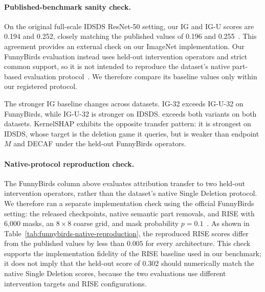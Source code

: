 \paragraph{Published-benchmark sanity check.}
On the original full-scale IDSDS ResNet-50 setting, our IG and IG-U scores are 0.194 and 0.252, closely matching the published values of 0.196 and 0.255~\citep{hesse2024benchmarking}. This agreement provides an external check on our ImageNet implementation. Our FunnyBirds evaluation instead uses held-out intervention operators and strict common support, so it is not intended to reproduce the dataset's native part-based evaluation protocol~\citep{hesse2023funnybirds}. We therefore compare its baseline values only within our registered protocol.


The stronger IG baseline changes across datasets. IG-32 exceeds IG-U-32 on FunnyBirds, while IG-U-32 is stronger on IDSDS.  exceeds both variants on both datasets. KernelSHAP exhibits the opposite transfer pattern: it is strongest on IDSDS, whose target is the deletion game it queries, but is weaker than endpoint $M$ and DECAF under the held-out FunnyBirds operators.

\paragraph{Native-protocol reproduction check.}
The FunnyBirds column above evaluates attribution transfer to two held-out
intervention operators, rather than the dataset's native Single Deletion
protocol. We therefore ran a separate implementation check using the official
FunnyBirds setting: the released checkpoints, native semantic part removals,
and RISE with 6,000 masks, an $8\times8$ coarse grid, and mask probability
$p=0.1$~\citep{hesse2023funnybirds}. As shown in
Table~\ref{tab:funnybirds-native-reproduction}, the reproduced RISE scores
differ from the published values by less than $0.005$ for every architecture.
This check supports the implementation fidelity of the RISE baseline used in
our benchmark; it does not imply that the held-out score of $0.302$ should
numerically match the native Single Deletion scores, because the two
evaluations use different intervention targets and RISE configurations.

